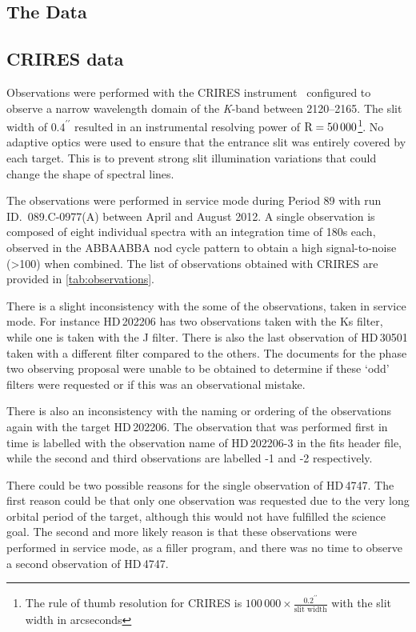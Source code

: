 
\subsection{The Data}

\subsection{CRIRES data}
\label{subsec:CRIRES}
Observations were performed with the {CRIRES} instrument~\citep{kaeufl_crires_2004} configured to observe a narrow wavelength domain of the \emph{K}-band between 2120--2165\nm{}.
The slit width of \(0.4^{\prime\prime}\) resulted in an instrumental resolving power of \(\textrm{R}=50\,000\)\footnote{The rule of thumb resolution for {CRIRES} is \(100\,000\times \frac{0.2^{\prime\prime}}{\textrm{slit width}}\) with the slit width in arcseconds}.
No adaptive optics were used to ensure that the entrance slit was entirely covered by each target.
This is to prevent strong slit illumination variations that could change the shape of spectral lines.

The observations were performed in service mode during {Period 89} with run {ID.~089.C-0977(A)} between April and August 2012.
A single observation is composed of eight individual spectra with an integration time of 180\si{\second} each, observed in the {ABBAABBA} nod cycle pattern to obtain a high signal-to-noise (>100) when combined.
The list of observations obtained with {CRIRES} are provided in \cref{tab:observations}.

There is a slight inconsistency with the some of the observations, taken in service mode.
For instance {HD\,202206} has two observations taken with the {Ks} filter, while one is taken with the {J} filter.
There is also the last observation of {HD\,30501} taken with a different filter compared to the others.
The documents for the phase two observing proposal were unable to be obtained to determine if these `odd' filters were requested or if this was an observational mistake.

There is also an inconsistency with the naming or ordering of the observations again with the target {HD\,202206}.
The observation that was performed first in time is labelled with the observation name of {HD\,202206-3} in the fits header file, while the second and third observations are labelled -1 and -2 respectively.

There could be two possible reasons for the single observation of {HD\,4747}.
The first reason could be that only one observation was requested due to the very long orbital period of the target, although this would not have fulfilled the science goal.
The second and more likely reason is that these observations were performed in service mode, as a filler program, and there was no time to observe a second observation of {HD\,4747}.

